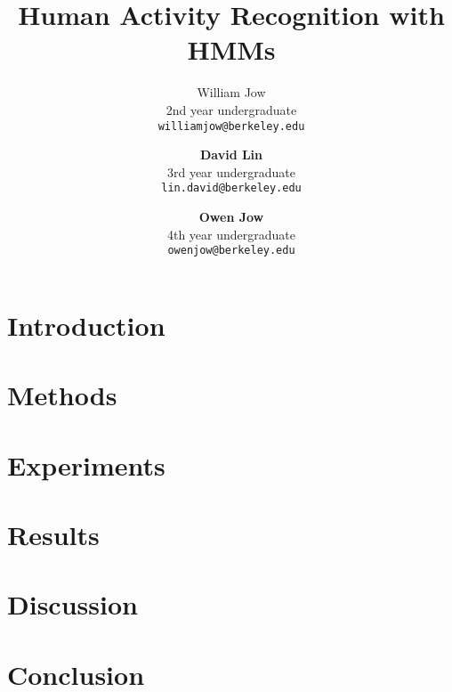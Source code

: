 \documentclass{article}
\title{Human Activity Recognition with HMMs}
\author{
  William Jow \\
  2nd year undergraduate \\
  \texttt{williamjow@berkeley.edu}
  \and
  \textbf{David Lin} \\
  3rd year undergraduate \\
  \texttt{lin.david@berkeley.edu}
  \and
  \textbf{Owen Jow} \\
  4th year undergraduate \\
  \texttt{owenjow@berkeley.edu}
}
\begin{document}
\maketitle

\begin{abstract}


\end{abstract}

\section{Introduction}

\cite{kd2016}

\section{Methods}


\section{Experiments}


\section{Results}


\section{Discussion}


\section{Conclusion}




\end{document}
